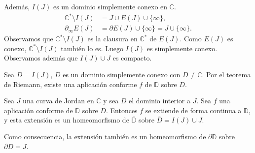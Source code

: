 Además, $I(J)$ es un dominio simplemente conexo en $\mathbb{C}$.
\begin{align*}
    \mathbb{C}^\ast \setminus I(J) & = J \cup E(J) \cup  \{\infty\},                      \\
    \partial_\infty E(J)           & = \partial E(J) \cup \{\infty\} = J \cup \{\infty\}.
\end{align*}
Observamos que $\mathbb{C}^\ast \setminus I(J)$ es la clausura en $\mathbb{C}^\ast$ de $E(J)$.
Como $E(J)$ es conexo, $\mathbb{C}^\ast \setminus I(J)$ también lo es.
Luego $I(J)$ es simplemente conexo.
Observamos además que $I(J) \cup J$ es compacto.

Sea $D = I(J)$, $D$ es un dominio simplemente conexo con $D \neq \mathbb{C}$.
Por el teorema de Riemann, existe una aplicación conforme $f$ de $\mathbb{D}$ sobre $D$.

\begin{theorem}
    Sea $J$ una curva de Jordan en $\mathbb{C}$ y sea $D$ el dominio interior a $J$.
    Sea $f$ una aplicación conforme de $\mathbb{D}$ sobre $D$.
    Entonces $f$ se extiende de forma continua a $\bar{\mathbb{D}}$, y esta extensión es un homeomorfismo de $\bar{\mathbb{D}}$ sobre $\bar{D} = I(J) \cup J$.
\end{theorem}

\begin{remark}
    Como consecuencia, la extensión también es un homeomorfismo de $\partial\mathbb{D}$ sobre $\partial D = J$.
\end{remark}